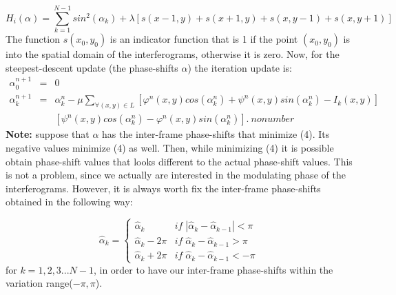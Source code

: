 \begin{equation}
H_{i}(\alpha)=\sum_{k=1}^{N-1}sin^{2}(\alpha_{k})+\lambda[s(x-1,y)+s(x+1,y)+s(x,
y-1)+s(x,y+1)]
\end{equation}
The function $s(x_{0},y_{0})$ is an indicator function that is 1
if the point $(x_{0},y_{0})$ is into the spatial domain of the interferograms,
otherwise it is zero. Now, for the steepest-descent update (the phase-shifts
$\alpha$) the iteration update is:
\begin{eqnarray}
\alpha_{0}^{n+1} & = & 0\\
\alpha_{k}^{n+1} & = & \alpha_{k}^{n}-\mu\sum_{\forall(x,y)\in L}[\varphi^{n}(x,
y)cos(\alpha_{k}^{n})+\psi^{n}(x,y)sin(\alpha_{k}^{n})-I_{k}(x,y)]\\
 &  & [\psi^{n}(x,y)cos(\alpha_{k}^{n})-\varphi^{n}(x,y)sin(\alpha_{k}^{n})].\
nonumber 
\end{eqnarray}
\textbf{Note:} suppose that $\alpha$ has the inter-frame phase-shifts
that minimize (4). Its negative values minimize (4) as well. Then,
while minimizing (4) it is possible obtain phase-shift values that
looks different to the actual phase-shift values. This is not a problem,
since we actually are interested in the modulating phase of the interferograms.
However, it is always worth fix the inter-frame phase-shifts obtained
in the following way:

\begin{equation}
\widehat{\alpha}_{k}=\begin{cases}
\widehat{\alpha}_{k} & if\;|\widehat{\alpha}_{k}-\widehat{\alpha}_{k-1}|<\pi\\
\widehat{\alpha}_{k}-2\pi &
if\;\widehat{\alpha}_{k}-\widehat{\alpha}_{k-1}>\pi\\
\widehat{\alpha}_{k}+2\pi & if\;\widehat{\alpha}_{k}-\widehat{\alpha}_{k-1}<-\pi
\end{cases}
\end{equation}
for $k=1,2,3...N-1$, in order to have our inter-frame
phase-shifts within the variation range($-\pi,\pi$).

